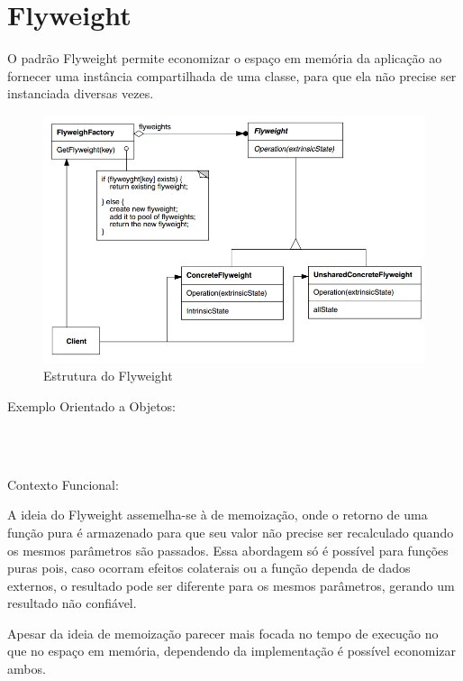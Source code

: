 \section{Flyweight}

O padrão Flyweight permite economizar o espaço em memória 
da aplicação ao fornecer uma instância compartilhada de 
uma classe, para que ela não precise ser instanciada 
diversas vezes.

\begin{figure}[htb]
	\caption{\label{flyweight_struct}Estrutura do Flyweight}
	\begin{center}
	    \includegraphics[scale=0.5]{5_padroes-contexto-funcional/5.2_estruturais/5.2.6_flyweight/diagram.png}
	\end{center}
\end{figure}

Exemplo Orientado a Objetos:

\begin{lstlisting}[caption={Flyweight Orientado a Objetos},label=ooflyweight]



\end{lstlisting}

Contexto Funcional:

A ideia do Flyweight assemelha-se à de memoização, onde o 
retorno de uma função pura é armazenado para que seu valor 
não precise ser recalculado quando os mesmos parâmetros 
são passados. Essa abordagem só é possível para funções 
puras pois, caso ocorram efeitos colaterais ou a função 
dependa de dados externos, o resultado pode ser diferente 
para os mesmos parâmetros, gerando um resultado não 
confiável.

Apesar da ideia de memoização parecer mais focada no tempo 
de execução no que no espaço em memória, dependendo da 
implementação é possível economizar ambos.

\begin{lstlisting}[caption={Flyweight Funcional},label=fpflyweight]
    

    
\end{lstlisting}